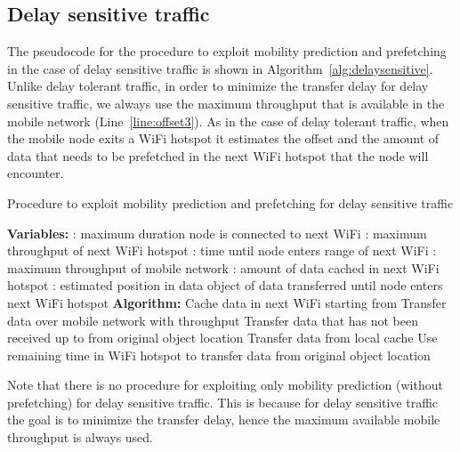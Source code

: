 \documentclass{sig-alternate}
\newcommand{\mynotex}[1]{}
\begin{document}
\subsection{Delay sensitive traffic}

The pseudocode for the procedure to exploit mobility prediction and prefetching in the case of delay sensitive traffic is shown in Algorithm~\ref{alg:delaysensitive}.
Unlike delay tolerant traffic, in order to minimize the transfer delay for delay sensitive traffic, we always use the maximum throughput that is available in the mobile network (Line~\ref{line:offset3}).
As in the case of delay tolerant traffic, when  the mobile node exits a WiFi hotspot it estimates the offset and the amount of data that needs to be prefetched in the next WiFi hotspot that the node will encounter.

\begin{algorithm}
\caption{Procedure to exploit mobility prediction and prefetching for delay sensitive traffic}
\begin{algorithmic}[1]
\label{alg:delaysensitive}
{\scriptsize
\STATE \textbf{Variables:}
\STATE : maximum duration node is connected  to next WiFi
\STATE : maximum throughput of next WiFi hotspot
\STATE : time until node enters range of next WiFi
\STATE : maximum throughput of mobile network
\STATE : amount of data cached  in next WiFi hotspot
\STATE : estimated position in data object of data transferred until node enters next WiFi hotspot
\STATE \textbf{Algorithm:}
\STATE 
\STATE  \label{line:offset3}
\STATE Cache  data in next WiFi starting from 
\STATE Transfer data over mobile network with throughput 
\STATE Transfer data that has not been received up to  from original object location
\STATE Transfer data from  local cache
\STATE Use remaining time in WiFi hotspot to transfer data from original object location
\ENDIF
\label{line:2end}
\\ }
\end{algorithmic}
\end{algorithm}


Note that there is no procedure for exploiting only mobility prediction (without prefetching) for delay sensitive traffic. This is because for delay sensitive traffic the goal is to minimize the transfer delay, hence the maximum available mobile throughput is always used.


\mynotex{
\begin{itemize}
\item Different with procedure in previous subsection is that we use maximum throughput of mobile.
\item Based on mobility prediction need to decide amount of data to cache in next WiFi hotspot and offset of data to cache from
\end{itemize}
}
\end{document}
